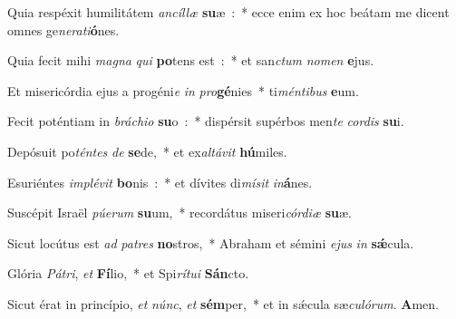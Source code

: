 ﻿\item Quia respéxit humilitátem \emph{an}\emph{cíl}\emph{læ} \textbf{su}æ~:~* ecce enim ex hoc beátam me dicent omnes ge\emph{ne}\emph{ra}\emph{ti}\textbf{ó}nes.
\item Quia fecit mihi \emph{ma}\emph{gna} \emph{qui} \textbf{po}tens est~:~* et san\emph{ctum} \emph{no}\emph{men} \textbf{e}jus.
\item Et misericórdia ejus a progéni\emph{e} \emph{in} \emph{pro}\textbf{gé}nies~* ti\emph{mén}\emph{ti}\emph{bus} \textbf{e}um.
\item Fecit poténtiam in \emph{brá}\emph{chi}\emph{o} \textbf{su}o~:~* dispérsit supérbos men\emph{te} \emph{cor}\emph{dis} \textbf{su}i.
\item Depósuit po\emph{tén}\emph{tes} \emph{de} \textbf{se}de,~* et ex\emph{al}\emph{tá}\emph{vit} \textbf{hú}miles.
\item Esuriéntes \emph{im}\emph{plé}\emph{vit} \textbf{bo}nis~:~* et dívites di\emph{mí}\emph{sit} \emph{in}\textbf{á}nes.
\item Suscépit Israël \emph{pú}\emph{e}\emph{rum} \textbf{su}um,~* recordátus miseri\emph{cór}\emph{di}\emph{æ} \textbf{su}æ.
\item Sicut locútus est \emph{ad} \emph{pa}\emph{tres} \textbf{no}stros,~* Abraham et sémini \emph{e}\emph{jus} \emph{in} \textbf{sǽ}cula.
\item Glória \emph{Pá}\emph{tri}, \emph{et} \textbf{Fí}lio,~* et Spi\emph{rí}\emph{tu}\emph{i} \textbf{Sán}cto.
\item Sicut érat in princípio, \emph{et} \emph{núnc}, \emph{et} \textbf{sém}per,~* et in sǽcula sæ\emph{cu}\emph{ló}\emph{rum}. \textbf{A}men.